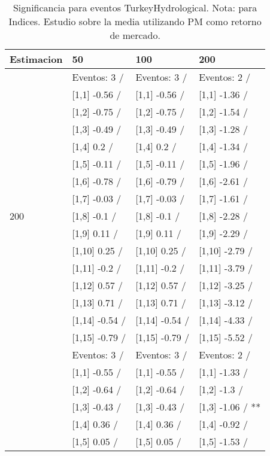 \begin{table}

\caption{Significancia para eventos TurkeyHydrological. Nota: para Indices. Estudio sobre la media utilizando PM como retorno de mercado.}
\centering
\begin{tabular}[t]{llll}
\toprule
Estimacion & 50 & 100 & 200\\
\midrule
 & Eventos:  3 / & Eventos:  3 / & Eventos:  2 /\\
 & {}[1,1] -0.56  / & {}[1,1] -0.56  / & {}[1,1] -1.36  /\\
 & {}[1,2] -0.75  / & {}[1,2] -0.75  / & {}[1,2] -1.54  /\\
 & {}[1,3] -0.49  / & {}[1,3] -0.49  / & {}[1,3] -1.28  /\\
 & {}[1,4] 0.2  / & {}[1,4] 0.2  / & {}[1,4] -1.34  /\\
\addlinespace
 & {}[1,5] -0.11  / & {}[1,5] -0.11  / & {}[1,5] -1.96  /\\
 & {}[1,6] -0.78  / & {}[1,6] -0.79  / & {}[1,6] -2.61  /\\
 & {}[1,7] -0.03  / & {}[1,7] -0.03  / & {}[1,7] -1.61  /\\
200 & {}[1,8] -0.1  / & {}[1,8] -0.1  / & {}[1,8] -2.28  /\\
 & {}[1,9] 0.11  / & {}[1,9] 0.11  / & {}[1,9] -2.29  /\\
\addlinespace
 & {}[1,10] 0.25  / & {}[1,10] 0.25  / & {}[1,10] -2.79  /\\
 & {}[1,11] -0.2  / & {}[1,11] -0.2  / & {}[1,11] -3.79  /\\
 & {}[1,12] 0.57  / & {}[1,12] 0.57  / & {}[1,12] -3.25  /\\
 & {}[1,13] 0.71  / & {}[1,13] 0.71  / & {}[1,13] -3.12  /\\
 & {}[1,14] -0.54  / & {}[1,14] -0.54  / & {}[1,14] -4.33  /\\
\addlinespace
 & {}[1,15] -0.79  / & {}[1,15] -0.79  / & {}[1,15] -5.52  /\\
 & Eventos:  3 / & Eventos:  3 / & Eventos:  2 /\\
 & {}[1,1] -0.55  / & {}[1,1] -0.55  / & {}[1,1] -1.33  /\\
 & {}[1,2] -0.64  / & {}[1,2] -0.64  / & {}[1,2] -1.3  /\\
 & {}[1,3] -0.43  / & {}[1,3] -0.43  / & {}[1,3] -1.06  / **\\
\addlinespace
 & {}[1,4] 0.36  / & {}[1,4] 0.36  / & {}[1,4] -0.92  /\\
 & {}[1,5] 0.05  / & {}[1,5] 0.05  / & {}[1,5] -1.53  /\\

\end{tabular}
\end{table}
